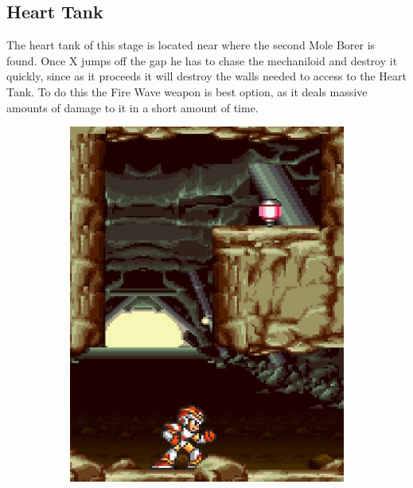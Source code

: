 \subsection{Heart Tank}
The heart tank of this stage is located near where the second Mole Borer is found. Once  X jumps off the gap he has to chase the mechaniloid and destroy it quickly, since as it proceeds it will destroy the walls needed to access to the Heart Tank. To do this the Fire Wave weapon is best option, as it deals massive amounts of damage to it in a short amount of time. 
\begin{figure}[htp]
	\centering
	\begin{subfigure}{0.3\linewidth}
		\centering
		\includegraphics[width=\linewidth]{figures/X1/Armored_armadillo/Armadillo_heart.jpg}
		\caption{}
	\end{subfigure}
	\begin{subfigure}{0.3\textwidth}
		\centering

\end{subfigure}
\end{figure}
